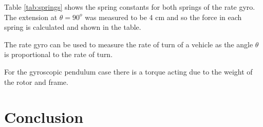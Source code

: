 \documentclass[8pt]{article}
\begin{document}
Table \ref{tab:springs} shows the spring constants for both springs of the rate gyro.
The extension at $\theta = 90^o$ was measured to be 4 cm and so the force in each spring is calculated and shown in the table.

The rate gyro can be used to measure the rate of turn of a vehicle as the angle $\theta$ is proportional to the rate of turn.




For the gyroscopic pendulum case there is a torque acting due to the weight of the rotor and frame.









\section{Conclusion}
\end{document}
